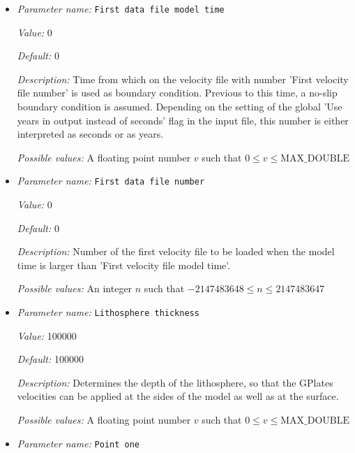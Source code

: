 \begin{itemize}
{\it Possible values:} A boolean value (true or false)
\item {\it Parameter name:} {\tt First data file model time}
\label{parameters:Boundary velocity model/GPlates model/First data file model time}


{\it Value:} 0


{\it Default:} 0


{\it Description:} Time from which on the velocity file with number 'First velocity file number' is used as boundary condition. Previous to this time, a no-slip boundary condition is assumed. Depending on the setting of the global 'Use years in output instead of seconds' flag in the input file, this number is either interpreted as seconds or as years.


{\it Possible values:} A floating point number $v$ such that $0 \leq v \leq \text{MAX\_DOUBLE}$
\item {\it Parameter name:} {\tt First data file number}
\label{parameters:Boundary velocity model/GPlates model/First data file number}


{\it Value:} 0


{\it Default:} 0


{\it Description:} Number of the first velocity file to be loaded when the model time is larger than 'First velocity file model time'.


{\it Possible values:} An integer $n$ such that $-2147483648\leq n \leq 2147483647$
\item {\it Parameter name:} {\tt Lithosphere thickness}
\label{parameters:Boundary velocity model/GPlates model/Lithosphere thickness}


{\it Value:} 100000


{\it Default:} 100000


{\it Description:} Determines the depth of the lithosphere, so that the GPlates velocities can be applied at the sides of the model as well as at the surface.


{\it Possible values:} A floating point number $v$ such that $0 \leq v \leq \text{MAX\_DOUBLE}$
\item {\it Parameter name:} {\tt Point one}
\label{parameters:Boundary velocity model/GPlates model/Point one}



\end{itemize}
